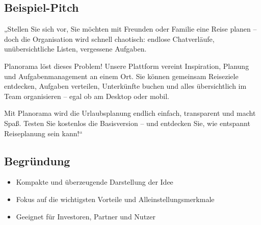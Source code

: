 \documentclass{article}
\begin{document}
\subsection{Beispiel-Pitch}\label{beispiel-pitch}

„Stellen Sie sich vor, Sie möchten mit Freunden oder Familie eine Reise
planen -- doch die Organisation wird schnell chaotisch: endlose
Chatverläufe, unübersichtliche Listen, vergessene Aufgaben.

Planorama löst dieses Problem! Unsere Plattform vereint Inspiration,
Planung und Aufgabenmanagement an einem Ort. Sie können gemeinsam
Reiseziele entdecken, Aufgaben verteilen, Unterkünfte buchen und alles
übersichtlich im Team organisieren -- egal ob am Desktop oder mobil.

Mit Planorama wird die Urlaubsplanung endlich einfach, transparent und
macht Spaß. Testen Sie kostenlos die Basisversion -- und entdecken Sie,
wie entspannt Reiseplanung sein kann!{\kern0pt}``

\subsection{Begründung}\label{begruxfcndung-2}

\begin{itemize}
\tightlist
\item
  Kompakte und überzeugende Darstellung der Idee
\item
  Fokus auf die wichtigsten Vorteile und Alleinstellungsmerkmale
\item
  Geeignet für Investoren, Partner und Nutzer
\end{itemize}
\end{document}
